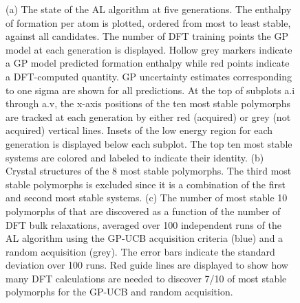 \begin{figure}[!htb]
\centering
{}
\caption{\label{fig:iro2_al}
%
(a) The state of the AL algorithm at five generations.
%
The enthalpy of formation per atom is plotted, ordered from most to least stable, against all \IrOthree candidates.
%
The number of DFT training points the GP model at each generation is displayed.
%
Hollow grey markers indicate a GP model predicted formation enthalpy while red points indicate a DFT-computed quantity.
%
GP uncertainty estimates corresponding to one sigma are shown for all predictions.
%
At the top of subplots a.i through a.v, the x-axis positions of the ten most stable polymorphs are tracked at each generation by either red (acquired) or grey (not acquired) vertical lines.
%
Insets of the low energy region for each generation is displayed below each subplot.
%
The top ten most stable systems are colored and labeled to indicate their identity.
%
(b) Crystal structures of the \num{8} most stable \IrOthree polymorphs.
%
The third most stable polymorphs is excluded since it is a combination of the first and second most stable systems.
%
(c) The number of most stable \num{10} polymorphs of \IrOthree that are discovered as a function of the number of DFT bulk relaxations,
averaged over \num{100} independent runs of the AL algorithm using the GP-UCB acquisition criteria (blue) and a random acquisition (grey).
%
The error bars indicate the standard deviation over \num{100} runs.
%
Red guide lines are displayed to show how many DFT calculations are needed to discover \num{7/10} of most stable polymorphs for the GP-UCB and random acquisition.
}
\end{figure}

